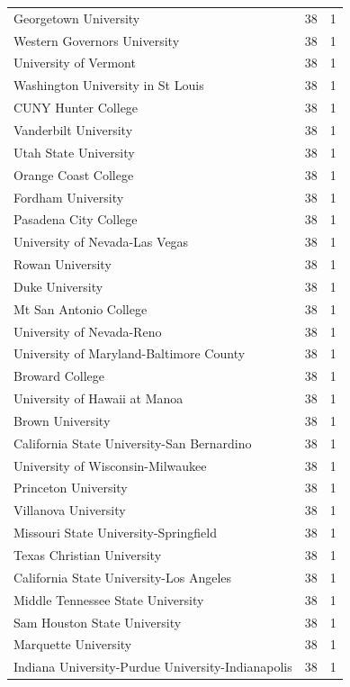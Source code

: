 \documentclass{mcmthesis}
\begin{document}
\begin{appendices}
    
    \newpage
    \begin{tabular}{lcc}\hline
        Georgetown University	&38&	1\\
        Western Governors University	&38&	1\\
        University of Vermont	&38&	1\\
        Washington University in St Louis	&38	&1\\
        CUNY Hunter College&	38&	1\\
        Vanderbilt University	&38	&1\\
        Utah State University	&38&	1\\
        Orange Coast College	&38&	1\\
        Fordham University	&38	&1\\
        Pasadena City College	&38	&1\\
        University of Nevada-Las Vegas	&38	&1\\
        Rowan University	&38&	1\\
        Duke University&	38	&1\\
        Mt San Antonio College	&38	&1\\
        University of Nevada-Reno	&38&	1\\
        University of Maryland-Baltimore County	&38&	1\\
        Broward College	&38	&1\\
        University of Hawaii at Manoa	&38	&1\\
        Brown University	&38	&1\\
        California State University-San Bernardino	&38	&1\\
        University of Wisconsin-Milwaukee	&38	&1\\
        Princeton University	&38	&1\\
        Villanova University	&38	&1\\
        Missouri State University-Springfield	&38&	1\\
        Texas Christian University	&38	&1\\
        California State University-Los Angeles&	38	&1\\
        Middle Tennessee State University	&38	&1\\
        Sam Houston State University	&38	&1\\
        Marquette University	&38	&1\\
        Indiana University-Purdue University-Indianapolis	&38&	1\\

\end{tabular}
\end{appendices}
\end{document}
